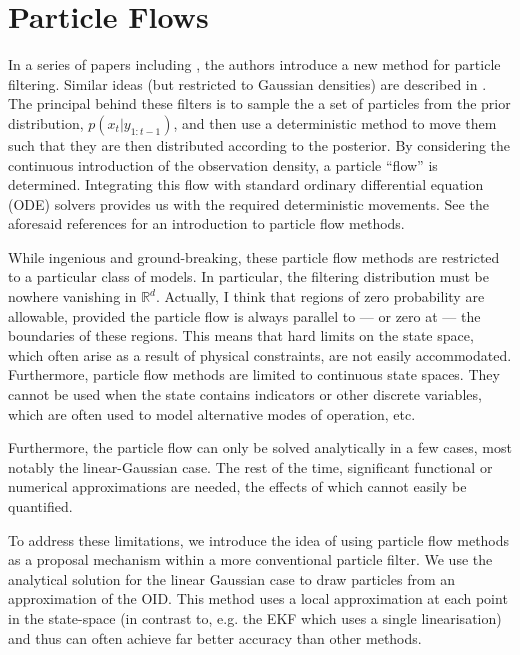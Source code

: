 \documentclass{article}
\begin{document}
\section{Particle Flows}

In a series of papers including \cite{Daum2008,Daum2011d,Daum2012a}, the authors introduce a new method for particle filtering. Similar ideas (but restricted to Gaussian densities) are described in \cite{Reich2011}. The principal behind these filters is to sample the a set of particles from the prior distribution, $p(x_t | y_{1:t-1})$, and then use a deterministic method to move them such that they are then distributed according to the posterior. By considering the continuous introduction of the observation density, a particle ``flow'' is determined. Integrating this flow with standard ordinary differential equation (ODE) solvers provides us with the required deterministic movements. See the aforesaid references for an introduction to particle flow methods.

While ingenious and ground-breaking, these particle flow methods are restricted to a particular class of models. In particular, the filtering distribution must be nowhere vanishing in $\mathbb{R}^d$. {\meta Actually, I think that regions of zero probability are allowable, provided the particle flow is always parallel to --- or zero at --- the boundaries of these regions.} This means that hard limits on the state space, which often arise as a result of physical constraints, are not easily accommodated. Furthermore, particle flow methods are limited to continuous state spaces. They cannot be used when the state contains indicators or other discrete variables, which are often used to model alternative modes of operation, etc.

Furthermore, the particle flow can only be solved analytically in a few cases, most notably the linear-Gaussian case. The rest of the time, significant functional or numerical approximations are needed, the effects of which cannot easily be quantified.

To address these limitations, we introduce the idea of using particle flow methods as a proposal mechanism within a more conventional particle filter. We use the analytical solution for the linear Gaussian case to draw particles from an approximation of the OID. This method uses a local approximation at each point in the state-space (in contrast to, e.g. the EKF which uses a single linearisation) and thus can often achieve far better accuracy than other methods.
\end{document}
